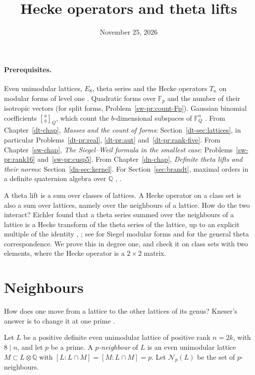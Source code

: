 \documentclass[reqno]{amsart}
\title{Hecke operators and theta lifts}
\author{}
\date{November 25, 2026}
\newcounter{chap}
\theoremstyle{definition}
\theoremstyle{plain}
\newcommand{\Q}{\mathbb{Q}}
\newcommand{\F}{\mathbb{F}}
\newcommand{\Nb}{\mathcal{N}}
\newcommand{\qbinom}[3]{\genfrac{[}{]}{0pt}{}{#1}{#2}_{#3}}
\begin{document}
\maketitle
{}\label{chap}

\paragraph{Prerequisites.}
Even unimodular lattices, \(E_8\), theta series and the Hecke operators \(T_n\) on modular forms of level one \cite[Ch.~V and VII]{SeA}.  Quadratic forms over \(\F_p\) and the number of their isotropic vectors (for split forms, Problem~\ref{sw-pr:count-Fp}).  Gaussian binomial coefficients \(\qbinom{a}{b}{Q}\), which count the \(b\)-dimensional subspaces of \(\F_Q^a\) \cite[Ch.~3]{Andr}.  From Chapter~\ref{dt-chap}, \emph{Masses and the count of forms}: Section~\ref{dt-sec:lattices}, in particular Problems~\ref{dt-pr:real}, \ref{dt-pr:aut} and~\ref{dt-pr:rank-five}.  From Chapter~\ref{sw-chap}, \emph{The Siegel--Weil formula in the smallest case}: Problems~\ref{sw-pr:rank16} and~\ref{sw-pr:cusp5}.  From Chapter~\ref{dn-chap}, \emph{Definite theta lifts and their norms}: Section~\ref{dn-sec:kernel}.  For Section~\ref{sec:brandt}, maximal orders in a definite quaternion algebra over \(\Q\) \cite{Gr}, \cite{Pi}.

A theta lift is a sum over classes of lattices.  A Hecke operator on a class set is also a sum over lattices, namely over the neighbours of a lattice.  How do the two interact?  Eichler found that a theta series summed over the neighbours of a lattice is a Hecke transform of the theta series of the lattice, up to an explicit multiple of the identity \cite{Ei52}, \cite{Ei73}; see \cite{An} for Siegel modular forms and \cite{Ra} for the general theta correspondence.  We prove this in degree one, and check it on class sets with two elements, where the Hecke operator is a \(2 \times 2\) matrix.


\section{Neighbours}\label{sec:neighbours}

How does one move from a lattice to the other lattices of its genus?  Kneser's answer is to change it at one prime \cite{Kn}.

Let \(L\) be a positive definite even unimodular lattice of positive rank \(n = 2k\), with \(8 \mid n\), and let \(p\) be a prime.  A \emph{\(p\)-neighbour} of \(L\) is an even unimodular lattice \(M \subset L \otimes \Q\) with \([L : L \cap M] = [M : L \cap M] = p\).  Let \(\Nb_p(L)\) be the set of \(p\)-neighbours.
\end{document}
